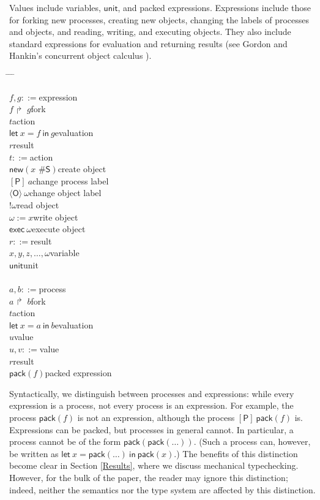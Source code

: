 \documentclass{sigplanconf}
\newenvironment{defn}{\begin{tabbing}
  \hspace{1.5em} \= \hspace{.20\linewidth - 1.5em} \= \hspace{1.5em} \= \kill
  }{
  \end{tabbing}}
\newcommand{\entry}[2]{\>$#1$\>\>#2}
\newcommand{\clause}[2]{$#1$\>\>#2}
\newcommand{\mycategory}[2]{\clause{#1::=}{#2}}
\newcommand{\labp}{\mathsf P}
\newcommand{\labo}{\mathsf O}
\newcommand{\labb}{\mathsf S}
\newcommand{\fork}[2]{#1\Rsh\:\!#2}
\newcommand{\eval}[3]{\mathsf{let}~#1=#2~\mathsf{in}~#3}
\begin{document}
Values include variables, $\mathsf{unit}$, and packed expressions. Expressions include those for forking new processes, creating new objects, changing the labels of processes and objects, and reading, writing, and executing objects. 
They also include standard expressions for evaluation and returning
results (see Gordon and Hankin's concurrent object calculus \cite{gordon98concurrent}).  
\begin{defn}
\mycategory{f,g}{expression} \\
\entry{\fork f g}{fork} \\
\entry{t}{action} \\
\entry{\eval x f g}{evaluation} \\
\entry{r}{result} \\
\mycategory{t}{action} \\
\entry{\mathsf{new}(x\mbox{ \# }\labb)}{create object} \\
\entry{[\labp]~a}{change process label} \\
\entry{\langle\labo\rangle~\omega}{change object label}\\
\entry{!\omega}{read object} \\
\entry{\omega := x}{write object} \\
\entry{\mathsf{exec}~\omega}{execute object} \\
\mycategory{r}{result} \\
\entry{x,y,z,\dots,\omega}{variable} \\
\entry{\mathsf{unit}}{unit} \\
\\
\mycategory{a,b}{process} \\
\entry{\fork a b}{fork} \\
\entry{t}{action}  \\
\entry{\eval x a b}{evaluation} \\
\entry{u}{value} \\
\mycategory{u,v}{value} \\
\entry{r}{result} \\
\entry{\mathsf{pack}(f)}{packed expression} 
\end{defn}
Syntactically, we distinguish between processes and expressions: while every expression is a process, not every process is an expression. For example, the process $\mathsf{pack}(f)$ is not an expression, although the process $[\labp]~\mathsf{pack}(f)$ is. Expressions can be packed, but processes in general cannot. In particular, a process cannot be of the form $\mathsf{pack}(\mathsf{pack}(\dots))$. (Such a process can, however, be written as $\eval x {\mathsf{pack}(\dots)}\mathsf{pack}(x)$.) The benefits of this distinction become clear in Section \ref{Results}, where we discuss mechanical typechecking. However, for the bulk of the paper, the reader may ignore this distinction; indeed, neither the semantics nor the type system are affected by this distinction. 
\end{document}
